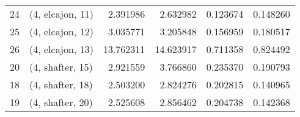 \begin{tabular}{llrrrr}
24 &  (4, elcajon, 11) &   2.391986 &   2.632982 &   0.123674 &  0.148260 \\
25 &  (4, elcajon, 12) &   3.035771 &   3.205848 &   0.156959 &  0.180517 \\
26 &  (4, elcajon, 13) &  13.762311 &  14.623917 &   0.711358 &  0.824492 \\
20 &  (4, shafter, 15) &   2.921559 &   3.766860 &   0.235370 &  0.190793 \\
18 &  (4, shafter, 18) &   2.503200 &   2.824276 &   0.202815 &  0.140965 \\
19 &  (4, shafter, 20) &   2.525608 &   2.856462 &   0.204738 &  0.142368 \\
\bottomrule
\end{tabular}
